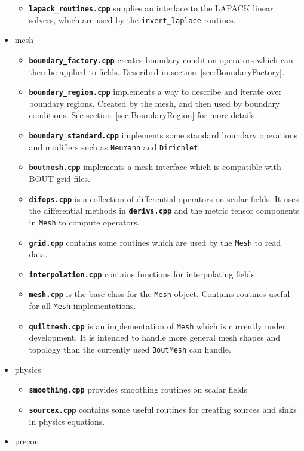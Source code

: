 \documentclass[12pt]{article}
\newcommand{\code}[1]{\texttt{#1}}
\newcommand{\file}[1]{\texttt{\bf #1}}
\begin{document}
\begin{itemize}
\begin{itemize}
  \item \file{lapack\_routines.cpp} supplies an interface to the LAPACK linear
    solvers, which are used by the \code{invert\_laplace} routines.
  \end{itemize}
\item mesh
  \begin{itemize}
  \item \file{boundary\_factory.cpp} creates boundary condition operators
    which can then be applied to fields. Described in
    section~\ref{sec:BoundaryFactory}.
  \item \file{boundary\_region.cpp} implements a way to describe and iterate
    over boundary regions. Created by the mesh, and then used by boundary
    conditions. See section~\ref{sec:BoundaryRegion} for more details.
  \item \file{boundary\_standard.cpp} implements some standard boundary
    operations and modifiers such as \code{Neumann} and \code{Dirichlet}.
  \item \file{boutmesh.cpp} implements a mesh interface which is compatible
    with BOUT grid files.
  \item \file{difops.cpp} is a collection of differential operators on scalar
    fields. It uses the differential methods in \file{derivs.cpp} and the
    metric tensor components in \code{Mesh} to compute operators.
  \item \file{grid.cpp} contains some routines which are used by the \code{Mesh}
    to read data. 
  \item \file{interpolation.cpp} contains functions for interpolating fields
  \item \file{mesh.cpp} is the base class for the \code{Mesh} object. Contains
    routines useful for all \code{Mesh} implementations.
  \item \file{quiltmesh.cpp} is an implementation of \code{Mesh} which is
    currently under development. It is intended to handle more general mesh
    shapes and topology than the currently used \code{BoutMesh} can handle.
  \end{itemize}
\item physics
  \begin{itemize}
  \item \file{smoothing.cpp} provides smoothing routines on scalar fields
  \item \file{sourcex.cpp} contains some useful routines for creating
    sources and sinks in physics equations.
  \end{itemize}
\item precon

\end{itemize}
\end{document}

